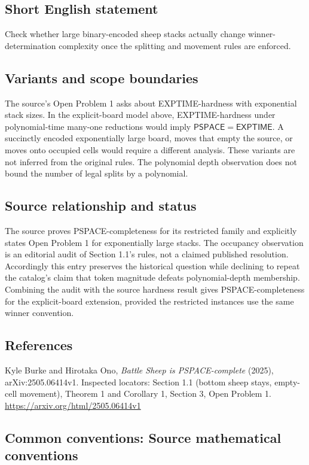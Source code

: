 \documentclass[11pt,a4paper]{article}
\begin{document}
\subsection*{Short English statement}
Check whether large binary-encoded sheep stacks actually change winner-determination complexity once the splitting and movement rules are enforced.

\subsection*{Variants and scope boundaries}
The source's Open Problem 1 asks about EXPTIME-hardness with exponential stack sizes. In the explicit-board model above, EXPTIME-hardness under polynomial-time many-one reductions would imply $\mathsf{PSPACE}=\mathsf{EXPTIME}$. A succinctly encoded exponentially large board, moves that empty the source, or moves onto occupied cells would require a different analysis. These variants are not inferred from the original rules. The polynomial depth observation does not bound the number of legal splits by a polynomial.

\subsection*{Source relationship and status}
The source proves PSPACE-completeness for its restricted family and explicitly states Open Problem 1 for exponentially large stacks. The occupancy observation is an editorial audit of Section 1.1's rules, not a claimed published resolution. Accordingly this entry preserves the historical question while declining to repeat the catalog's claim that token magnitude defeats polynomial-depth membership. Combining the audit with the source hardness result gives PSPACE-completeness for the explicit-board extension, provided the restricted instances use the same winner convention.

\subsection*{References}
\begingroup\footnotesize\raggedright
\noindent [S1] Kyle Burke and Hirotaka Ono, \emph{Battle Sheep is PSPACE-complete} (2025), arXiv:2505.06414v1. Inspected locators: Section 1.1 (bottom sheep stays, empty-cell movement), Theorem 1 and Corollary 1, Section 3, Open Problem 1.
\url{https://arxiv.org/html/2505.06414v1}
\par\endgroup

\subsection*{Common conventions: Source mathematical conventions}
\end{document}
